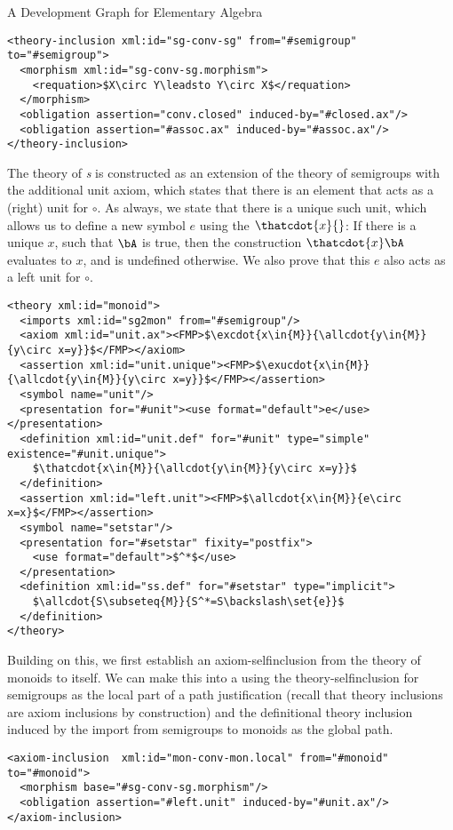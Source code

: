 \begin{omgroup}[id=dg-elal]{A Development Graph for Elementary Algebra}
\begin{lstlisting}[mathescape,
  index={theory-inclusion,morphism,requation}]
<theory-inclusion xml:id="sg-conv-sg" from="#semigroup" to="#semigroup">
  <morphism xml:id="sg-conv-sg.morphism">
    <requation>$X\circ Y\leadsto Y\circ X$</requation>
  </morphism>
  <obligation assertion="conv.closed" induced-by="#closed.ax"/>
  <obligation assertion="#assoc.ax" induced-by="#assoc.ax"/>
</theory-inclusion>
\end{lstlisting}
The theory of {\emph{s}} is constructed as an extension of the theory of
semigroups with the additional unit axiom, which states that there is an element that acts
as a (right) unit for $\circ$. As always, we state that there is a unique such unit, which
allows us to define a new symbol $e$ using the
{} $\thatcdot{x}{}$: If there is a unique $x$,
such that $\bA$ is true, then the construction $\thatcdot{x}\bA$ evaluates to $x$, and is
undefined otherwise. We also prove that this $e$ also acts as a left unit for $\circ$.

\begin{lstlisting}[mathescape]
<theory xml:id="monoid">
  <imports xml:id="sg2mon" from="#semigroup"/>
  <axiom xml:id="unit.ax"><FMP>$\excdot{x\in{M}}{\allcdot{y\in{M}}{y\circ x=y}}$</FMP></axiom>
  <assertion xml:id="unit.unique"><FMP>$\exucdot{x\in{M}}{\allcdot{y\in{M}}{y\circ x=y}}$</FMP></assertion>
  <symbol name="unit"/>
  <presentation for="#unit"><use format="default">e</use></presentation>
  <definition xml:id="unit.def" for="#unit" type="simple" existence="#unit.unique">
    $\thatcdot{x\in{M}}{\allcdot{y\in{M}}{y\circ x=y}}$
  </definition>
  <assertion xml:id="left.unit"><FMP>$\allcdot{x\in{M}}{e\circ x=x}$</FMP></assertion>
  <symbol name="setstar"/>
  <presentation for="#setstar" fixity="postfix">
    <use format="default">$^*$</use>
  </presentation>
  <definition xml:id="ss.def" for="#setstar" type="implicit">
    $\allcdot{S\subseteq{M}}{S^*=S\backslash\set{e}}$
  </definition>
</theory>
\end{lstlisting}
Building on this, we first establish an axiom-selfinclusion from the theory of
monoids to itself. We can make this into a {} using
the theory-selfinclusion for semigroups as the local part of a path justification
(recall that theory inclusions are axiom inclusions by construction) and the
definitional theory inclusion induced by the import from semigroups to monoids as
the global path.
\begin{lstlisting}[mathescape,index={axiom-inclusion,theory-inclusion,morphism,obligation}]
<axiom-inclusion  xml:id="mon-conv-mon.local" from="#monoid" to="#monoid">
  <morphism base="#sg-conv-sg.morphism"/>
  <obligation assertion="#left.unit" induced-by="#unit.ax"/>
</axiom-inclusion>


\end{lstlisting}
\end{omgroup}
